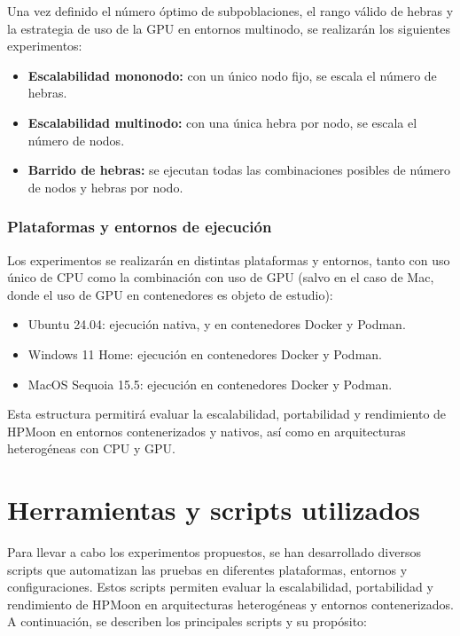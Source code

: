 Una vez definido el número óptimo de subpoblaciones, el rango válido de hebras y la estrategia de uso de la GPU en entornos multinodo, se realizarán los siguientes experimentos:

\begin{itemize}
    \item \textbf{Escalabilidad mononodo:} con un único nodo fijo, se escala el número de hebras.
    \item \textbf{Escalabilidad multinodo:} con una única hebra por nodo, se escala el número de nodos.
    \item \textbf{Barrido de hebras:} se ejecutan todas las combinaciones posibles de número de nodos y hebras por nodo.
\end{itemize}

\subsubsection{Plataformas y entornos de ejecución}

Los experimentos se realizarán en distintas plataformas y entornos, tanto con uso único de CPU como la combinación con uso de GPU (salvo en el caso de Mac, donde el uso de GPU en contenedores es objeto de estudio):

\begin{itemize}
    \item Ubuntu 24.04: ejecución nativa, y en contenedores Docker y Podman.
    \item Windows 11 Home: ejecución en contenedores Docker y Podman.
    \item MacOS Sequoia 15.5: ejecución en contenedores Docker y Podman.
\end{itemize}

Esta estructura permitirá evaluar la escalabilidad, portabilidad y rendimiento de HPMoon en entornos contenerizados y nativos, así como en arquitecturas heterogéneas con CPU y GPU.

\section{Herramientas y scripts utilizados}\label{sec:herramientas_scripts}

Para llevar a cabo los experimentos propuestos, se han desarrollado diversos scripts que automatizan las pruebas en diferentes plataformas, entornos y configuraciones. Estos scripts permiten evaluar la escalabilidad, portabilidad y rendimiento de HPMoon en arquitecturas heterogéneas y entornos contenerizados. A continuación, se describen los principales scripts y su propósito:

